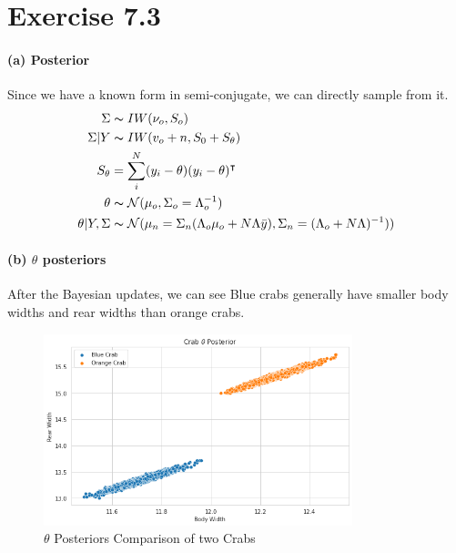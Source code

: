 \documentclass[11pt, letterpaper]{article}
\begin{document}
\section{Exercise 7.3}
\paragraph{(a) Posterior}
Since we have a known form in semi-conjugate, we can directly sample from it.
\begin{align*}
    \Sigma &\thicksim IW(\nu_o, S_o) \\ 
    \Sigma|Y &\thicksim IW(v_o + n, S_0+S_{\theta}) \\
    S_{\theta} &= \sum_i^N (y_i - \theta)(y_i - \theta)^{\intercal} \\
    \theta &\thicksim \mathcal{N}(\mu_o, \Sigma_o = \Lambda_o^{-1}) \\
    \theta|Y, \Sigma &\thicksim \mathcal{N}(
        \mu_n = \Sigma_n(\Lambda_o\mu_o+N\Lambda\bar{y}),
        \Sigma_n = (\Lambda_o + N\Lambda)^{-1})
    )    
\end{align*}

\paragraph{(b) $\theta$ posteriors}
After the Bayesian updates, we can see Blue crabs generally have smaller body widths and rear widths than orange crabs.
\begin{figure}[!h]
  \centering
  \includegraphics[width=0.8\textwidth]{3.1.png}
  \captionsetup{justification=centering}
  \caption{$\theta$ Posteriors Comparison of two Crabs}
\end{figure}

\newpage
\end{document}
